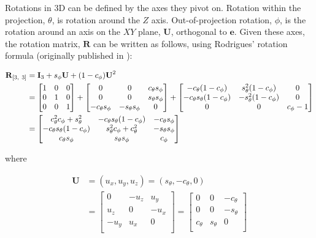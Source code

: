 \documentclass{monashthesis}
\begin{document}
Rotations in 3D can be defined by the axes they pivot on. Rotation within the projection, \(\theta\), is rotation around the \(Z\) axis. Out-of-projection rotation, \(\phi\), is the rotation around an axis on the \(XY\) plane, \(\textbf{U}\), orthogonal to \(\textbf{e}\). Given these axes, the rotation matrix, \(\textbf{R}\) can be written as follows, using Rodrigues' rotation formula (originally published in \textcite{rodrigues_lois_1840}):

\begin{align*}
    \textbf{R}_{[3,~3]} 
    &= \textbf{I}_3 + s_\phi\*\textbf{U} + (1-c_\phi)\*\textbf{U}^2 \\
        &=
    \begin{bmatrix}
      1 & 0 & 0 \\ 
      0 & 1 & 0 \\ 
      0 & 0 & 1 \\
    \end{bmatrix} +
    \begin{bmatrix}
      0 & 0 & c_\theta s_\phi \\
      0 & 0 & s_\theta s_\phi \\
      -c_\theta s_\phi & -s_\theta s_\phi & 0 \\
    \end{bmatrix} +
    \begin{bmatrix}
      -c_\theta (1-c_\phi) & s^2_\theta (1-c_\phi) & 0 \\
      -c_\theta s_\theta (1-c_\phi) & -s^2_\theta (1-c_\phi) & 0 \\
      0 & 0 & c_\phi-1 \\
    \end{bmatrix} \\
    &= 
    \begin{bmatrix}
      c_\theta^2 c_\phi + s_\theta^2 &
      -c_\theta s_\theta (1 - c_\phi) &
      -c_\theta s_\phi \\
      -c_\theta s_\theta (1 - c_\phi) &
      s_\theta^2 c_\phi + c_\theta^2 &
      -s_\theta s_\phi \\
      c_\theta s_\phi &
      s_\theta s_\phi &
      c_\phi
    \end{bmatrix} \\
\end{align*}

\noindent where

\begin{align*}
  \textbf{U} &= (u_x, u_y, u_z) =
  (s_\theta, -c_\theta, 0) \\ 
  &=
  \begin{bmatrix}
  0 & -u_z & u_y  \\
  u_z & 0 & -u_x \\
  -u_y & u_x & 0 \\
  \end{bmatrix} =
  \begin{bmatrix}
    0 & 0 & -c_\theta \\
    0 & 0 & -s_\theta \\
    c_\theta & s_\theta & 0 \\
  \end{bmatrix} \\
  \end{align*}
\end{document}
